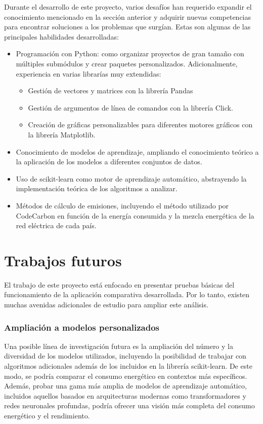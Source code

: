 Durante el desarrollo de este proyecto, varios desafíos han requerido expandir el conocimiento mencionado en la sección anterior y adquirir nuevas competencias para encontrar soluciones a los problemas que surgían. Estas son algunas de las principales habilidades desarrolladas:

\begin{itemize}
    \item Programación con Python: como organizar proyectos de gran tamaño con múltiples submódulos y crear paquetes personalizados. Adicionalmente, experiencia en varias librarías muy extendidas:
    \begin{itemize}
        \item Gestión de vectores y matrices con la librería Pandas
        \item Gestión de argumentos de línea de comandos con la librería Click.
        \item Creación de gráficas personalizables para diferentes motores gráficos con la librería Matplotlib.
    \end{itemize}
    \item Conocimiento de modelos de aprendizaje, ampliando el conocimiento teórico a la aplicación de los modelos a diferentes conjuntos de datos.
    \item Uso de scikit-learn como motor de aprendizaje automático, abstrayendo la implementación teórica de los algoritmos a analizar.
    \item Métodos de cálculo de emisiones, incluyendo el método utilizado por CodeCarbon en función de la energía consumida y la mezcla energética de la red eléctrica de cada país.
\end{itemize}


\section{Trabajos futuros}
\label{sec:trabajos_futuros}

El trabajo de este proyecto está enfocado en presentar pruebas básicas del funcionamiento de la aplicación comparativa desarrollada. Por lo tanto, existen muchas avenidas adicionales de estudio para ampliar este análisis. 

\subsubsection{Ampliación a modelos personalizados}
Una posible línea de investigación futura es la ampliación del número y la diversidad de los modelos utilizados, incluyendo la posibilidad de trabajar con algoritmos adicionales además de los incluidos en la librería scikit-learn. De este modo, se podría comparar el consumo energético en contextos más específicos. Además, probar una gama más amplia de modelos de aprendizaje automático, incluidos aquellos basados en arquitecturas modernas como transformadores y redes neuronales profundas, podría ofrecer una visión más completa del consumo energético y el rendimiento.

